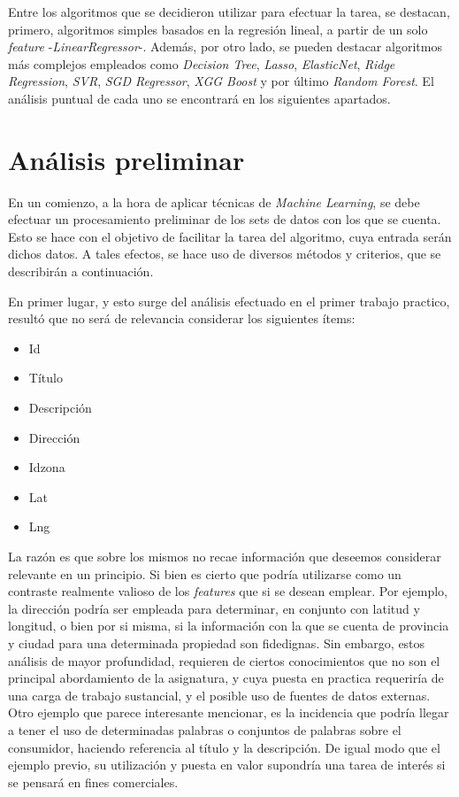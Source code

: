 \documentclass[titlepage,a4paper,11pt]{article}
\begin{document}
Entre los algoritmos que se decidieron utilizar para efectuar la tarea, se destacan, primero, algoritmos simples basados en la regresión lineal, a partir de un solo \textit{feature} -\textit{LinearRegressor}-. Además, por otro lado, se pueden destacar algoritmos más complejos empleados como \textit{Decision Tree}, \textit{Lasso}, \textit{ElasticNet}, \textit{Ridge Regression}, \textit{SVR}, \textit{SGD Regressor}, \textit{XGG Boost} y por último \textit{Random Forest}. El análisis puntual de cada uno se encontrará en los siguientes apartados.

\section{Análisis preliminar}
En un comienzo, a la hora de aplicar técnicas de \textit{Machine Learning}, se debe efectuar un procesamiento preliminar de los sets de datos con los que se cuenta. Esto se hace con el objetivo de facilitar la tarea del algoritmo, cuya entrada serán dichos datos. A tales efectos, se hace uso de diversos métodos y criterios, que se describirán a continuación.

En primer lugar, y esto surge del análisis efectuado en el primer trabajo practico, resultó que no será de relevancia considerar los siguientes ítems:

\begin{itemize}
	\item Id
	\item Título
	\item Descripción
	\item Dirección
	\item Idzona
	\item Lat
	\item Lng
\end{itemize}

La razón es que sobre los mismos no recae información que deseemos considerar relevante en un principio. Si bien es cierto que podría utilizarse como un contraste realmente valioso de los \textit{features} que si se desean emplear. Por ejemplo, la dirección podría ser empleada para determinar, en conjunto con latitud y longitud, o bien por si misma, si la información con la que se cuenta de provincia y ciudad para una determinada propiedad son fidedignas. Sin embargo, estos análisis de mayor profundidad, requieren de ciertos conocimientos que no son el principal abordamiento de la asignatura, y cuya puesta en practica requeriría de una carga de trabajo sustancial, y el posible uso de fuentes de datos externas. Otro ejemplo que parece interesante mencionar, es la incidencia que podría llegar a tener el uso de determinadas palabras o conjuntos de palabras sobre el consumidor, haciendo referencia al título y la descripción. De igual modo que el ejemplo previo, su utilización y puesta en valor supondría una tarea de interés si se pensará en fines comerciales.
\end{document}
